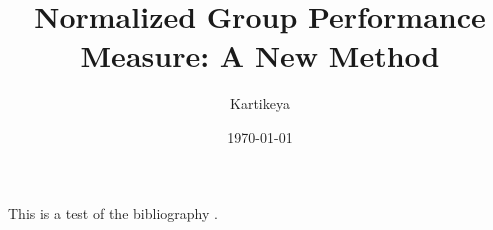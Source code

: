 \documentclass{apa7}
\title{Normalized Group Performance Measure: A New Method}
\author{Kartikeya}
\affiliation{Independent Researcher}
\date{\today}
\begin{document}
	
	\maketitle
	
	This is a test of the bibliography \cite{silentkarmi2025normalized}.
	
	\printbibliography
	
\end{document}
